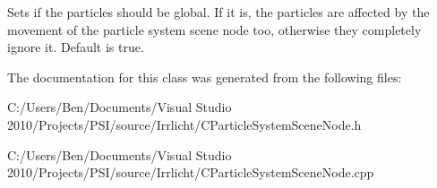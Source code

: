 Sets if the particles should be global. If it is, the particles are affected by the movement of the particle system scene node too, otherwise they completely ignore it. Default is true. 

The documentation for this class was generated from the following files\-:\begin{DoxyCompactItemize}
\item 
C\-:/\-Users/\-Ben/\-Documents/\-Visual Studio 2010/\-Projects/\-P\-S\-I/source/\-Irrlicht/C\-Particle\-System\-Scene\-Node.\-h\item 
C\-:/\-Users/\-Ben/\-Documents/\-Visual Studio 2010/\-Projects/\-P\-S\-I/source/\-Irrlicht/C\-Particle\-System\-Scene\-Node.\-cpp\end{DoxyCompactItemize}
